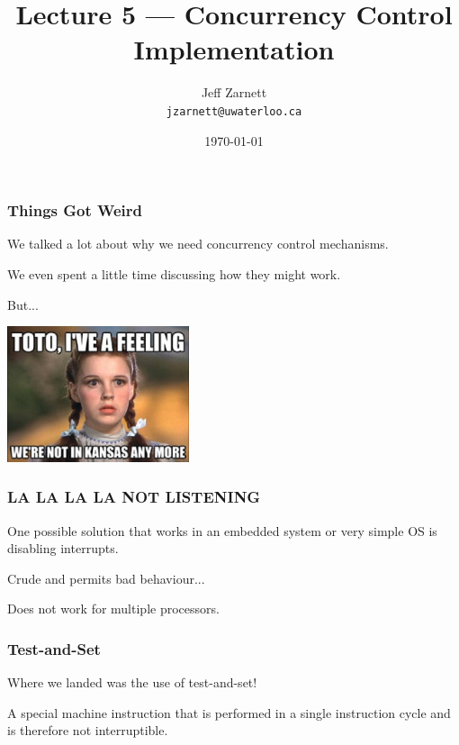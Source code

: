 


\title{Lecture 5 --- Concurrency Control Implementation }

\author{Jeff Zarnett \\ \small \texttt{jzarnett@uwaterloo.ca}}
\date{\today}




\begin{frame}
  \titlepage

 \end{frame}

\begin{frame}
\frametitle{Things Got Weird}

We talked a lot about why we need concurrency control mechanisms.

We even spent a little time discussing how they might work.

But...

\begin{center}
	\includegraphics[width=0.4\textwidth]{images/kansas.jpg}
\end{center}

\end{frame}

\begin{frame}
\frametitle{LA LA LA LA NOT LISTENING}

One possible solution that works in an embedded system or very simple OS is disabling interrupts. 

Crude and permits bad behaviour...

Does not work for multiple processors.

\end{frame}

\begin{frame}
\frametitle{Test-and-Set}

Where we landed was the use of test-and-set!

A special machine instruction that is performed in a single instruction cycle and is therefore not interruptible.

\end{frame}

